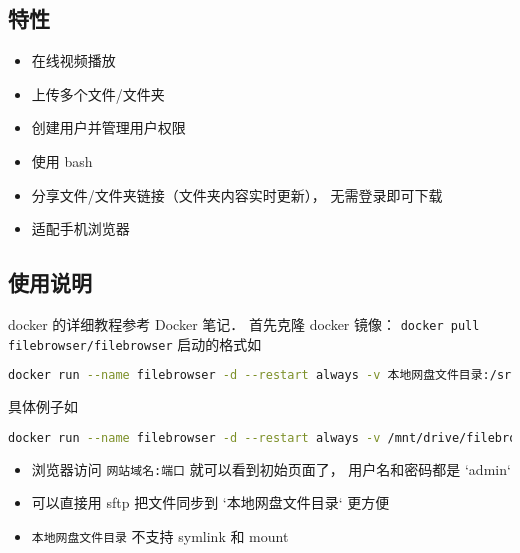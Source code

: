 
\begin{issues}
\issueDraft
\end{issues}

\subsection{特性}
\begin{itemize}
\item 在线视频播放
\item 上传多个文件/文件夹
\item 创建用户并管理用户权限
\item 使用 bash
\item 分享文件/文件夹链接（文件夹内容实时更新）， 无需登录即可下载
\item 适配手机浏览器
\end{itemize}

\subsection{使用说明}
docker 的详细教程参考 Docker 笔记． 首先克隆 docker 镜像： \verb|docker pull filebrowser/filebrowser|
启动的格式如
\begin{lstlisting}[language=bash]
docker run --name filebrowser -d --restart always -v 本地网盘文件目录:/srv -v /root/filebrowserconfig.json:/etc/config.json -v /root/filebrowser/database.db:/etc/database.db -p 端口号:80 filebrowser/filebrowser
\end{lstlisting}
具体例子如
\begin{lstlisting}[language=bash]
docker run --name filebrowser -d --restart always -v /mnt/drive/filebrowser/root:/srv -v /mnt/drive/filebrowser/filebrowserconfig.json:/etc/config.json -v /mnt/drive/filebrowser/database.db:/etc/database.db -p 5000:80 filebrowser/filebrowser
\end{lstlisting}

\begin{itemize}
\item 浏览器访问 \verb`网站域名:端口` 就可以看到初始页面了， 用户名和密码都是 `admin`
\item 可以直接用 sftp 把文件同步到 `本地网盘文件目录` 更方便
\item \verb`本地网盘文件目录` 不支持 symlink 和 mount
\end{itemize}
